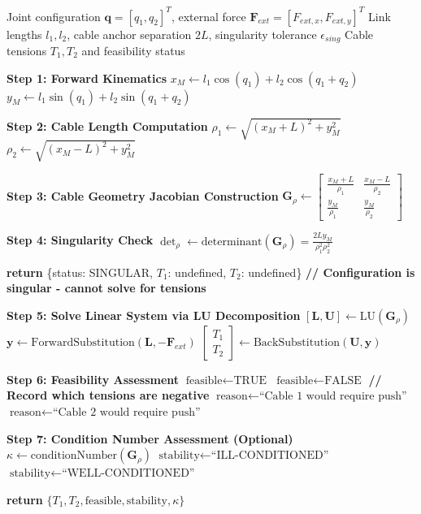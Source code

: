 \begin{algorithm}[H]
\caption{Cable Tension Computation and Feasibility Analysis}
\label{alg:cable_tension}
\begin{algorithmic}[1]
\REQUIRE Joint configuration $\bm{q} = [q_1, q_2]^T$, external force $\bm{F}_{ext} = [F_{ext,x}, F_{ext,y}]^T$
\REQUIRE Link lengths $l_1, l_2$, cable anchor separation $2L$, singularity tolerance $\epsilon_{sing}$
\ENSURE Cable tensions $T_1, T_2$ and feasibility status

\STATE \textbf{Step 1: Forward Kinematics}
\STATE $x_M \leftarrow l_1 \cos(q_1) + l_2 \cos(q_1 + q_2)$
\STATE $y_M \leftarrow l_1 \sin(q_1) + l_2 \sin(q_1 + q_2)$

\STATE \textbf{Step 2: Cable Length Computation}
\STATE $\rho_1 \leftarrow \sqrt{(x_M + L)^2 + y_M^2}$
\STATE $\rho_2 \leftarrow \sqrt{(x_M - L)^2 + y_M^2}$

\STATE \textbf{Step 3: Cable Geometry Jacobian Construction}
\STATE $\bm{G}_{\rho} \leftarrow \begin{bmatrix}
\frac{x_M + L}{\rho_1} & \frac{x_M - L}{\rho_2} \\
\frac{y_M}{\rho_1} & \frac{y_M}{\rho_2}
\end{bmatrix}$

\STATE \textbf{Step 4: Singularity Check}
\STATE $\det_{\rho} \leftarrow \text{determinant}(\bm{G}_{\rho}) = \frac{2L y_M}{\rho_1^2 \rho_2^2}$

    \STATE \textbf{return} \{status: SINGULAR, $T_1$: undefined, $T_2$: undefined\}
    \STATE \textbf{// Configuration is singular - cannot solve for tensions}
\ENDIF

\STATE \textbf{Step 5: Solve Linear System via LU Decomposition}
\STATE $[\bm{L}, \bm{U}] \leftarrow \text{LU}(\bm{G}_{\rho})$
\STATE $\bm{y} \leftarrow \text{ForwardSubstitution}(\bm{L}, -\bm{F}_{ext})$
\STATE $\begin{bmatrix} T_1 \\ T_2 \end{bmatrix} \leftarrow \text{BackSubstitution}(\bm{U}, \bm{y})$

\STATE \textbf{Step 6: Feasibility Assessment}
    \STATE $\text{feasible} \leftarrow \text{TRUE}$
\ELSE
    \STATE $\text{feasible} \leftarrow \text{FALSE}$
    \STATE \textbf{// Record which tensions are negative}
     \STATE $\text{reason} \leftarrow \text{``Cable 1 would require push''}$ \ENDIF
     \STATE $\text{reason} \leftarrow \text{``Cable 2 would require push''}$ \ENDIF
\ENDIF

\STATE \textbf{Step 7: Condition Number Assessment (Optional)}
\STATE $\kappa \leftarrow \text{conditionNumber}(\bm{G}_{\rho})$
    \STATE $\text{stability} \leftarrow \text{``ILL-CONDITIONED''}$
\ELSE
    \STATE $\text{stability} \leftarrow \text{``WELL-CONDITIONED''}$
\ENDIF

\STATE \textbf{return} $\{T_1, T_2, \text{feasible}, \text{stability}, \kappa\}$
\end{algorithmic}
\end{algorithm}

